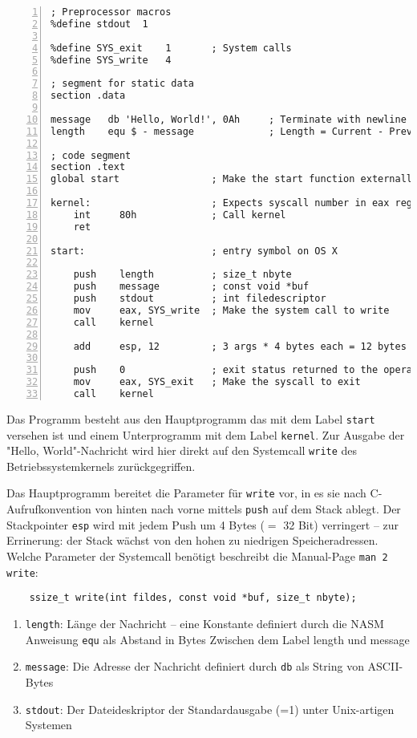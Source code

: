 \begin{lstlisting}[numbers=left,caption=hello.asm]
; Preprocessor macros
%define stdout  1

%define SYS_exit    1       ; System calls
%define SYS_write   4

; segment for static data
section .data

message   db 'Hello, World!', 0Ah     ; Terminate with newline
length    equ $ - message             ; Length = Current - Previous Address

; code segment
section .text
global start                ; Make the start function externally visible for the linker

kernel:                     ; Expects syscall number in eax register
    int     80h             ; Call kernel
    ret

start:                      ; entry symbol on OS X

    push    length          ; size_t nbyte
    push    message         ; const void *buf
    push    stdout          ; int filedescriptor
    mov     eax, SYS_write  ; Make the system call to write
    call    kernel
   
    add     esp, 12         ; 3 args * 4 bytes each = 12 bytes

    push    0               ; exit status returned to the operating system
    mov     eax, SYS_exit   ; Make the syscall to exit
    call    kernel
\end{lstlisting}

Das Programm besteht aus den Hauptprogramm das mit dem Label \texttt{start} versehen ist und einem Unterprogramm mit dem Label \texttt{kernel}. Zur Ausgabe der "Hello, World"-Nachricht wird hier direkt auf den Systemcall \texttt{write} des Betriebssystemkernels zurückgegriffen. 

Das Hauptprogramm bereitet die Parameter für \texttt{write} vor, in es sie nach C-Aufrufkonvention von hinten nach vorne mittels \texttt{push} auf dem Stack ablegt. Der Stackpointer \texttt{esp} wird mit jedem Push um 4 Bytes ($=$ 32 Bit) verringert – zur Errinerung: der Stack wächst von den hohen zu niedrigen Speicheradressen. Welche Parameter der Systemcall benötigt beschreibt die Manual-Page \texttt{man 2 write}:

\begin{lstlisting}
	ssize_t write(int fildes, const void *buf, size_t nbyte);
\end{lstlisting}

\begin{enumerate}
\item {\tt length}:	Länge der Nachricht – eine Konstante definiert durch die
NASM Anweisung {\tt equ} als Abstand in Bytes Zwischen dem Label length und message
\item {\tt message}: Die Adresse der Nachricht definiert durch {\tt db} als String von ASCII-Bytes
\item {\tt stdout}: Der Dateideskriptor der Standardausgabe (=1) unter Unix-artigen Systemen
\end{enumerate}

